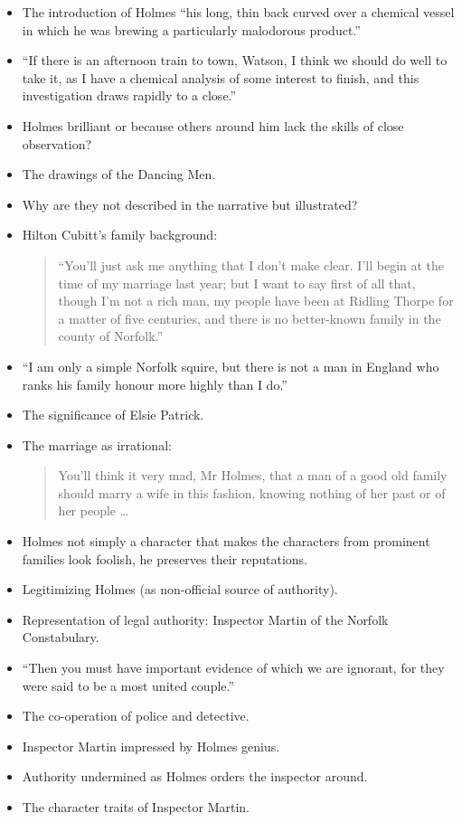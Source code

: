 \documentclass[a4paper,landscape,headrule,footrule,xetex]{foils}
\begin{document}

\begin{itemize}
\item The introduction
of Holmes “his long, thin back curved over a
chemical vessel in which he was brewing a particularly malodorous
product.”
\item “If there is an afternoon train to town, Watson, I think we should do
well to take it, as I have a chemical analysis of some interest to
finish, and this investigation draws rapidly to a close.”
\item 
Holmes brilliant or because others around him lack the skills of
close observation?
\item 
The drawings of the Dancing Men.
\item Why are they not described in the narrative but illustrated?
\item Hilton Cubitt’s family background:
  \begin{quote}
“You'll just ask me anything that I don't make clear. I'll begin at the
time of my marriage last year; but I want to say first of all that,
though I'm not a rich man, my people have been at Ridling Thorpe for
a matter of five centuries, and there is no better-known family in the
county of Norfolk.”
\end{quote}
\end{itemize}
\begin{itemize}
\item “I am only
a simple Norfolk squire, but there is not a
man in England who ranks his family honour more
highly than I do.”
\item The significance of Elsie Patrick.
\item The marriage as irrational:
  \begin{quote}
You'll think it very mad, Mr Holmes, that a man of a
good old family should marry a wife in this fashion,
knowing nothing of her past or of her people \ldots
\end{quote}
\item
Holmes not simply a character that makes the
characters from prominent families look foolish, he
preserves their reputations.
\end{itemize}

\begin{itemize}
\item Legitimizing
Holmes (as non-official source of authority).
\item 
Representation of legal authority: Inspector Martin of the
Norfolk Constabulary.
\item 
“Then you must have important evidence of which we are
ignorant, for they were said to be a most united couple.”
\item 
The co-operation of police and detective.
\item 
Inspector Martin impressed by Holmes genius.
\item 

Authority undermined as Holmes orders the inspector
around.
\item 
The character traits of Inspector Martin.
\end{itemize}
\end{document}
